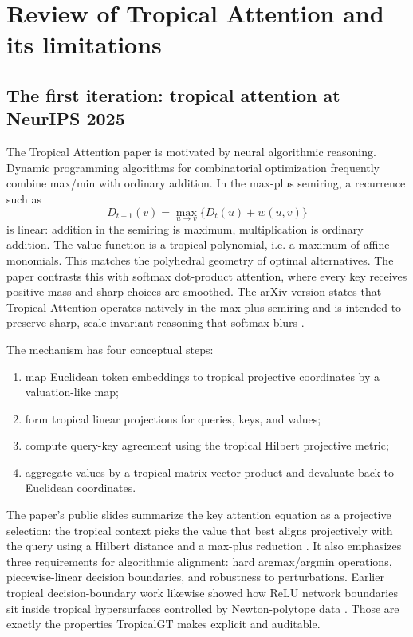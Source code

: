 \documentclass[11pt]{article}
\begin{document}
\section{Review of Tropical Attention and its limitations}

\subsection{The first iteration: tropical attention at NeurIPS 2025}

The Tropical Attention paper is motivated by neural algorithmic reasoning.  Dynamic programming algorithms for combinatorial optimization frequently combine max/min with ordinary addition.  In the max-plus semiring, a recurrence such as
\begin{equation}
D_{t+1}(v)=\max_{u\to v}\{D_t(u)+w(u,v)\}
\end{equation}
is linear: addition in the semiring is maximum, multiplication is ordinary addition.  The value function is a tropical polynomial, i.e. a maximum of affine monomials.  This matches the polyhedral geometry of optimal alternatives.  The paper contrasts this with softmax dot-product attention, where every key receives positive mass and sharp choices are smoothed.  The arXiv version states that Tropical Attention operates natively in the max-plus semiring and is intended to preserve sharp, scale-invariant reasoning that softmax blurs \cite{hashemi2025tropical}.

The mechanism has four conceptual steps:
\begin{enumerate}
\item map Euclidean token embeddings to tropical projective coordinates by a valuation-like map;
\item form tropical linear projections for queries, keys, and values;
\item compute query-key agreement using the tropical Hilbert projective metric;
\item aggregate values by a tropical matrix-vector product and devaluate back to Euclidean coordinates.
\end{enumerate}

The paper's public slides summarize the key attention equation as a projective selection: the tropical context picks the value that best aligns projectively with the query using a Hilbert distance and a max-plus reduction \cite{hashemi2025slides}.  It also emphasizes three requirements for algorithmic alignment: hard argmax/argmin operations, piecewise-linear decision boundaries, and robustness to perturbations.  Earlier tropical decision-boundary work likewise showed how ReLU network boundaries sit inside tropical hypersurfaces controlled by Newton-polytope data \cite{alfarra2022decision}.  Those are exactly the properties TropicalGT makes explicit and auditable.
\end{document}
